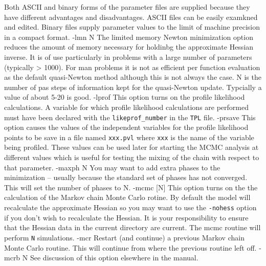 Both ASCII and binary forms of the parameter files are supplied because
they have different advantages and disadvantages. ASCII files can be
easily examkned and edited. Binary files supply parameter values 
to the limit of machine precision in a compact format.
\beginexample
 -lmn N
\endexample
The limited memory Newton minimization option reduces the amount
of memory necessary for holdinbg the approximate Hessian inverse.
It is of use particularly in problems with a large number of
parameters (typically > 1000). For man problems it is not as efficient
per function evaluation as the default quasi-Newton method although
this is not always the case. N is the number of pas steps of information
kept for the quasi-Newton update. Typcially a value of about 5-20
is good.
\beginexample
 -lprof     
\endexample 
This option turns on the profile likelihood calculations. 
A variable for which profile likelihood calculations are performed
must have been declared with the {\tt likeprof\_number} in the
{\tt TPL} file.
\beginexample
 -prsave     
\endexample 
This option causes the values of the independent variables 
for the profile likelihood points to be save in a file named
{\tt xxx.pvl} where {\tt xxx} is the name of the variable
being profiled. These values can be used later for starting
the MCMC analysis at different values which is useful for
testing the mixing of the chain with respect to that parameter.
\beginexample
 -maxph N     
\endexample 
You may want to add extra phases to the minimization -- usually
because the standard set of phases has not converged. This will
set the number of phases to N.
\beginexample
 -mcmc [N]    
\endexample 
This option turns on the the calculation of the Markov chain Monte Carlo
rotine. By default the model will recalculate the approximate Hessian
so you may want to use the {\tt -nohess} option if you don't wish
to recalculate the Hessian. It is your responsibility to ensure that
the Hessian data in the current directory are current.
The mcmc routine will perform {\tt N} simulations.
\beginexample
 -mcr    
\endexample 
Restart (and continue) a previous Markov chain Monte Carlo
routine. This will continue from where the previous routine
left off.
\beginexample
 -mcrb N  
\endexample
See discussion of this option elsewhere in the manual.

